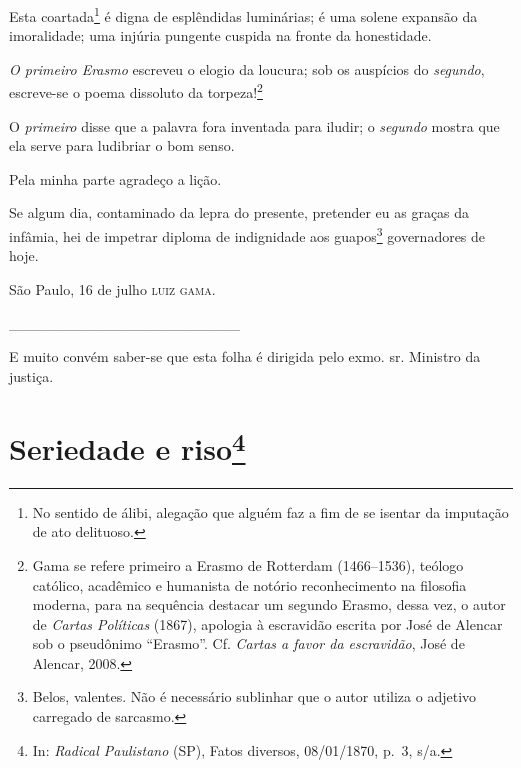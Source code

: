 Esta coartada\footnote{ No sentido de álibi, alegação que alguém faz a
  fim de se isentar da imputação de ato delituoso.} é digna de
esplêndidas luminárias; é uma solene expansão da imoralidade; uma
injúria pungente cuspida na fronte da honestidade.

\emph{O primeiro Erasmo} escreveu o elogio da loucura; sob os
auspícios do \emph{segundo}, escreve-se o poema dissoluto da
torpeza!\footnote{ Gama se refere primeiro a Erasmo de Rotterdam
  (1466--1536), teólogo católico, acadêmico e humanista de notório
  reconhecimento na filosofia moderna, para na sequência destacar um
  segundo Erasmo, dessa vez, o autor de \emph{Cartas Políticas} (1867),
  apologia à escravidão escrita por José de Alencar sob o pseudônimo
  ``Erasmo''. Cf. \emph{Cartas a favor da escravidão}, José de Alencar,
  2008.}

O \emph{primeiro} disse que a palavra fora inventada para iludir; o
\emph{segundo} mostra que ela serve para ludibriar o bom senso.

Pela minha parte agradeço a lição.

Se algum dia, contaminado da lepra do presente, pretender eu as graças
da infâmia, hei de impetrar diploma de indignidade aos guapos\footnote{
  Belos, valentes. Não é necessário sublinhar que o autor utiliza o
  adjetivo carregado de sarcasmo.} governadores de hoje.

\begin{flushright} São Paulo, 16 de julho
\textsc{luiz gama}.
\end{flushright}
\_\_\_\_\_\_\_\_\_\_\_\_\_\_\_\_\_\_\_\_\_\_

E muito convém saber-se que esta folha é dirigida pelo exmo. sr.
Ministro da justiça.

\chapter{Seriedade e riso\footnote{ In: \emph{Radical Paulistano} (SP), Fatos diversos,
  08/01/1870, p.~3, s/a.}} %

